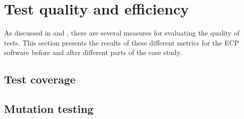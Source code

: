 
\section{Test quality and efficiency}

As discussed in  and , there are
several measures for evaluating the quality of tests. This section
presents the results of these different metrics for the ECP software
before and after different parts of the case study.\\


\subsection{Test coverage}
    


\subsection{Mutation testing}
    
